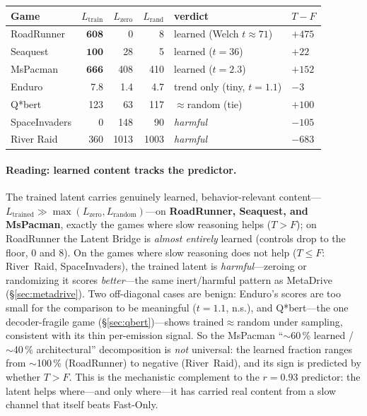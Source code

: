 \documentclass[11pt]{article}
\begin{document}
\smallskip\noindent
\begin{tabular}{lrrrll}
\toprule
Game & $L_{\text{train}}$ & $L_{\text{zero}}$ & $L_{\text{rand}}$ & verdict & $T\!-\!F$ \\
\midrule
RoadRunner    & $\mathbf{608}$ & 0     & 8     & learned (Welch $t\!\approx\!71$) & $+475$ \\
Seaquest      & $\mathbf{100}$ & 28    & 5     & learned ($t\!=\!36$)       & $+22$  \\
MsPacman      & $\mathbf{666}$ & 408   & 410   & learned ($t\!=\!2.3$)      & $+152$ \\
Enduro        & 7.8            & 1.4   & 4.7   & trend only (tiny, $t\!=\!1.1$) & $-3$ \\
Q*bert        & 123            & 63    & 117   & $\approx$random (tie)      & $+100$ \\
SpaceInvaders & 0              & 148   & 90    & \emph{harmful}             & $-105$ \\
River Raid    & 360            & 1013  & 1003  & \emph{harmful}             & $-683$ \\
\bottomrule
\end{tabular}\smallskip

\paragraph{Reading: learned content tracks the predictor.}
The trained latent carries genuinely learned, behavior-relevant content---$L_{\text{trained}}\!\gg\!\max(L_{\text{zero}},L_{\text{random}})$---on \textbf{RoadRunner, Seaquest, and MsPacman}, exactly the games where slow reasoning helps ($T\!>\!F$); on RoadRunner the Latent Bridge is \emph{almost entirely} learned (controls drop to the floor, $0$ and $8$). On the games where slow reasoning does not help ($T\!\le\!F$: River~Raid, SpaceInvaders), the trained latent is \emph{harmful}---zeroing or randomizing it scores \emph{better}---the same inert/harmful pattern as MetaDrive (\S\ref{sec:metadrive}). Two off-diagonal cases are benign: Enduro's scores are too small for the comparison to be meaningful ($t\!=\!1.1$, n.s.), and Q*bert---the one decoder-fragile game (\S\ref{sec:qbert})---shows trained$\approx$random under sampling, consistent with its thin per-emission signal. So the MsPacman ``$\sim$60\,\% learned / $\sim$40\,\% architectural'' decomposition is \emph{not} universal: the learned fraction ranges from $\sim$100\,\% (RoadRunner) to negative (River~Raid), and its sign is predicted by whether $T\!>\!F$. This is the mechanistic complement to the $r\!=\!0.93$ predictor: the latent helps where---and only where---it has carried real content from a slow channel that itself beats Fast-Only.
\end{document}

